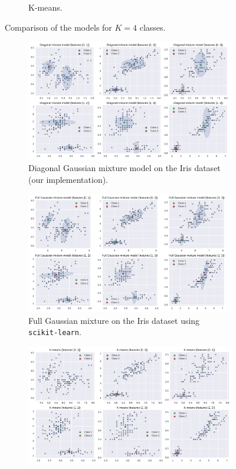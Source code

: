 \documentclass[11pt]{article}
\begin{document}
\begin{figure}
\begin{subfigure}[t]{.8\linewidth}
		\caption{K-means.}
	\end{subfigure}
	\caption{Comparison of the models for $K=4$ classes.}\label{fig:EMdiagfullComparisonK4}
\end{figure}

\begin{figure}
	\centering
	\begin{subfigure}[t]{.8\linewidth}
		\includegraphics[width=\linewidth]{images/diag_em_K2.pdf}
		\caption{Diagonal Gaussian mixture model on the Iris dataset (our implementation).}
	\end{subfigure}
	\begin{subfigure}[t]{.8\linewidth}
		\includegraphics[width=\linewidth]{images/full_em_K2.pdf}
		\caption{Full Gaussian mixture on the Iris dataset using \texttt{scikit-learn}.}
	\end{subfigure}
	\begin{subfigure}[t]{.8\linewidth}
		\includegraphics[width=\linewidth]{images/kmeans_K2.pdf}

\end{subfigure}
\end{figure}
\end{document}
